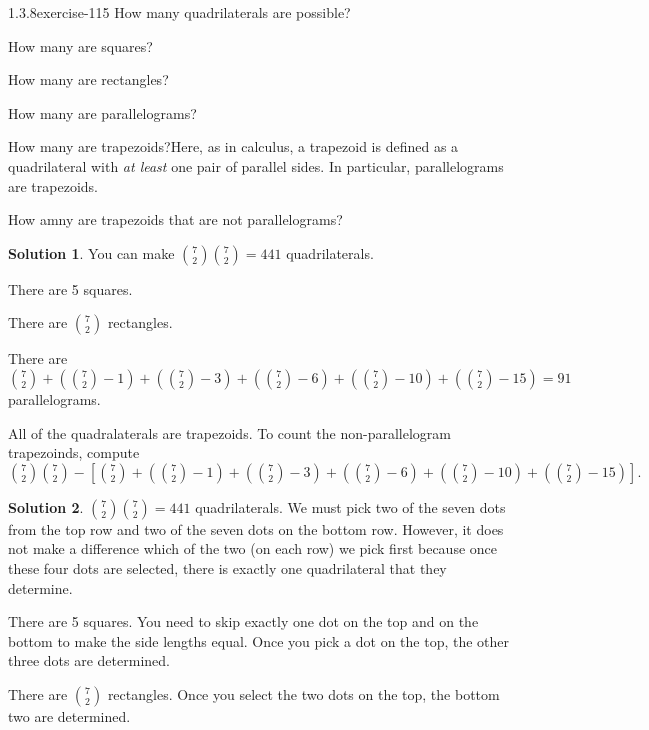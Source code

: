 \documentclass[twoside,11pt,]{book}
\numberwithin{equation}{chapter}
\begin{document}
\begin{divisionsolution}{1.3.8}{}{exercise-115}%
\hypertarget{p-1901}{}%
How many quadrilaterals are possible?%
\par
\hypertarget{p-1903}{}%
How many are squares?%
\par
\hypertarget{p-1905}{}%
How many are rectangles?%
\par
\hypertarget{p-1907}{}%
How many are parallelograms?%
\par
\hypertarget{p-1909}{}%
How many are trapezoids?Here, as in calculus, a trapezoid is defined as a quadrilateral with \emph{at least} one pair of parallel sides. In particular, parallelograms are trapezoids.%
\par
\hypertarget{p-1911}{}%
How amny are trapezoids that are not parallelograms?%
\par\smallskip%
\noindent\textbf{Solution 1}.\quad%
\hypertarget{p-1913}{}%
You can make \({7\choose 2}{7\choose 2} = 441\) quadrilaterals.%
\par
\hypertarget{p-1914}{}%
There are 5 squares.%
\par
\hypertarget{p-1915}{}%
There are \({7 \choose 2}\) rectangles.%
\par
\hypertarget{p-1916}{}%
There are \({7 \choose 2} + ({7 \choose 2}-1) + ({7 \choose 2} - 3) + ({7 \choose 2} - 6) + ({7 \choose 2} - 10) + ({7 \choose 2} - 15) = 91\) parallelograms.%
\par
\hypertarget{p-1917}{}%
All of the quadralaterals are trapezoids. To count the non-parallelogram trapezoinds, compute \({7\choose 2}{7\choose 2} - \left[ {7 \choose 2} + ({7 \choose 2}-1) + ({7 \choose 2} - 3) + ({7 \choose 2} - 6) + ({7 \choose 2} - 10) + ({7 \choose 2} - 15) \right]\text{.}\)%
\par\smallskip%
\noindent\textbf{Solution 2}.\quad%
\hypertarget{p-1918}{}%
\({7\choose 2}{7\choose 2} = 441\) quadrilaterals. We must pick two of the seven dots from the top row and two of the seven dots on the bottom row. However, it does not make a difference which of the two (on each row) we pick first because once these four dots are selected, there is exactly one quadrilateral that they determine.%
\par
\hypertarget{p-1919}{}%
There are 5 squares. You need to skip exactly one dot on the top and on the bottom to make the side lengths equal. Once you pick a dot on the top, the other three dots are determined.%
\par
\hypertarget{p-1920}{}%
There are \({7 \choose 2}\) rectangles. Once you select the two dots on the top, the bottom two are determined.%

\end{divisionsolution}
\end{document}
